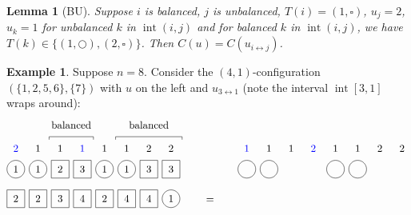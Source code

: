 \documentclass[submission]{FPSAC2018}
\newcommand{\0}{\phantom{c}}
\DeclareMathOperator{\inter}{int} %
\theoremstyle{plain}
\newtheorem{lemma}[thm]{Lemma}
\theoremstyle{definition}
\newtheorem{example}[thm]{Example}
\numberwithin{equation}{section}
\begin{document}
\begin{lemma}[BU]
\label{le:BU}
  Suppose $i$ is balanced, $j$ is unbalanced, $T(i) = (1,\square)$, $u_j = 2$, $u_k = 1$ for unbalanced $k$ in $\inter (i,j)$ and for balanced $k$ in $\inter(i,j)$, we have $T(k) \in \{(1,\bigcirc),(2,\square)\}$.
  Then $C(u) = C(u_{i \leftrightarrow j})$.
 \end{lemma}
 
\begin{example}
Suppose $n = 8$. Consider the $(4,1)$-configuration $(\{1,2,5,6\},\{7\})$ with $u$ on the left and $u_{3\leftrightarrow1}$ (note the interval $\inter[3,1]$ wraps around):
\[
\begin{tikzpicture}[baseline=25]
  \def\sc{0.75}   %
  \def\lll{2.7}   %
  \def\ll{2}   %
  \def\l{1}   %
  \node[color=blue] at (1*\sc,\lll) {$2$};
  \node[color=blue] at (4*\sc,\lll) {$1$};
  \foreach \i in {2,3,5,6} { \node at (\i*\sc,\lll){$1$}; }
  \foreach \i in {7,8} { \node at (\i*\sc,\lll){$2$}; }
  \foreach \i in {1,2,5,6} { \draw (\i*\sc,\ll) circle (0.3); }
  \foreach \i in {3,4,7,8} { \draw (\i*\sc-.3,\ll-.3) rectangle +(0.6,+0.6); }
  \foreach \i in {1,2,5,6} { \node at (\i*\sc,\ll) {$1$}; }
  \foreach \i in {3} { \node at (\i*\sc,\ll) {$2$}; }
  \foreach \i in {4,7,8} { \node at (\i*\sc,\ll) {$3$}; }
  \foreach \i in {8} { \draw (\i*\sc,\l) circle (0.3); }
  \foreach \i in {1,2,3,4,5,6,7} { \draw (\i*\sc-.3,\l-.3) rectangle +(0.6,+0.6); }
  \foreach \i in {4,6,7} { \node at (\i*\sc,\l) {$4$}; }
  \foreach \i in {8} { \node at (\i*\sc,\l) {$1$}; }
  \foreach \i in {3} { \node at (\i*\sc,\l) {$3$}; }
  \foreach \i in {1,2,5} { \node at (\i*\sc,\l) {$2$}; }
  \draw (2.5*\sc,3) -- (2.5*\sc,3.1) -- (4.5*\sc,3.1) -- (4.5*\sc,3);
  \node at (3.5*\sc,3.5) {balanced};
  \draw (5.5*\sc,3) -- (5.5*\sc,3.1) -- (8.5*\sc,3.1) -- (8.5*\sc,3);
  \node at (7.0*\sc,3.5) {balanced};
\end{tikzpicture}
\hspace{20pt} = \hspace{20pt}
\begin{tikzpicture}[baseline=25]
  \def\sc{0.75}   %
  \def\lll{2.7}   %
  \def\ll{2}   %
  \def\l{1}   %
  \node[color=blue] at (4*\sc,\lll) {$2$};
  \node[color=blue] at (1*\sc,\lll) {$1$};
  \foreach \i in {2,3,5,6} { \node at (\i*\sc,\lll){$1$}; }
  \foreach \i in {7,8} { \node at (\i*\sc,\lll){$2$}; }
  \foreach \i in {1,2,5,6} { \draw (\i*\sc,\ll) circle (0.3); }

\end{tikzpicture}\]
\end{example}
\end{document}
